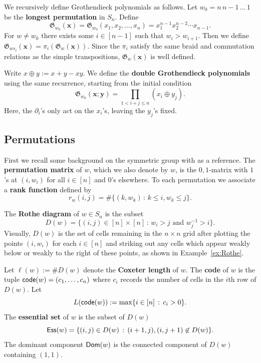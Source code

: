 \documentclass[12pt]{amsart}
\theoremstyle{definition}
\theoremstyle{remark}
\numberwithin{equation}{section}
\newcommand{\code}{{\sf code}}
\newcommand\mydef[1]{{\bf #1}}
\newcommand{\Ess}{{\sf Ess}}
\newcommand{\Sym}{S}
\begin{document}
	We recursively define Grothendieck polynomials as follows.	Let  $w_0=n \, n-1 \, \ldots \, 1$ be the \mydef{longest permutation} in $\Sym_n$. Define 
   \[\mathfrak G_{w_0}(\mathbf x)=\mathfrak G_{w_0}(x_1,x_2,\ldots,x_n)=x_1^{n-1}x_2^{n-2}\cdots x_{n-1}.\]
   For $w\neq w_0$ there exists some $i\in[n-1]$ such that $w_i>w_{i+1}$. Then we define $\mathfrak G_{ws_i}(\mathbf x)=\pi_i(\mathfrak G_w(\mathbf x))$.
	 Since the $\pi_i$ satisfy the same braid and commutation relations as the simple transpositions, $\mathfrak G_w(\mathbf x)$ is well defined. 
	 
	 




Write $x\oplus y:=x+y-xy$.  We define the \mydef{double Grothendieck polynomials} using the same recurrence, starting from the initial condition 
\[\mathfrak G_{w_0}(\mathbf x;\mathbf y)=\prod_{1<i+j\leq n}(x_i\oplus y_j).\]  Here, the $\partial_i$'s only act on the $x_i$'s, leaving the $y_j$'s fixed.

\subsection{Permutations}
	First we recall some background on the symmetric group with \cite{Manivel} as a reference.  The \mydef{permutation matrix} of $w$, which we also denote by $w$, is the $0,1$-matrix with $1$'s at $(i,w_i)$ for all $i\in[n]$ and $0$'s elsewhere. 	To each permutation we associate a \mydef{rank function} defined by \[r_w(i,j)=\#\{(k,w_{k}) \,:  \, k\leq i,w_{k} \leq j \}.\]
	
	The \mydef{Rothe diagram} of $w\in \Sym_n$ is the subset
	\[ D(w)= \{(i, j)\in [n]\times [n] \,:  \,  w_i > j \text{ and } w^{-1}_j > i\}.\]
	Visually, $D(w)$ is the set of cells remaining in the $n\times n$ grid after plotting the points $(i,w_i)$ for each $i\in[n]$ and striking out any cells which appear weakly below or weakly to the right of these points, as shown in Example~\ref{ex:Rothe}.

Let $\ell(w):=\# D(w)$ denote the {\bf Coxeter length} of $w$.
The \mydef{code} of $w$ is the tuple $\code(w)=(c_1,\ldots,c_n)$ where $c_i$ records the number of cells in the $i$th row of $D(w)$. Let 
\[{L}(\code(w)):=\max\{i\in[n] \,:  \, c_i>0\}.\]
The \mydef{essential set} of $w$ is the subset of $D(w)$
\[\Ess(w)=\{(i,j)\in D(w) \,:  \, (i+1,j),(i,j+1)\not \in D(w)\}.\] 
The dominant component ${\sf Dom}(w)$ is the connected component of $D(w)$ containing $(1,1)$.
\end{document}
